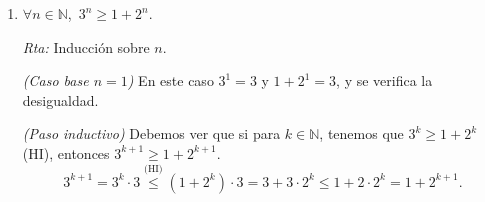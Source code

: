 \documentclass[12pt,spanish,makeidx]{amsbook}
\newcommand{\rta}{\noindent\textit{Rta: }}
\begin{document}
\begin{enumerate}
\begin{enumerate}
			\rta  Se probara por inducción sobre $n$. 
			
			\textit{(Caso base $n=4$) } En  este caso $4^2 = 16$ y $2^4 = 16$, luego $4^2 \le 2^4$.
			
			\textit{(Paso inductivo)} Debemos probar que si para $k \ge 4$ se cumple  que  $k^2\leq 2^k$ (HI),  entonces $(k+1)^2\leq 2^{k+1}$. 
			\begin{equation*}
			\begin{array}{rclr}
				(k+1)^2 &=& k^2 + 2k +1 \overset{\text{(HI)}}{\le} 2^k +2k +1. \hfill &\quad \hfill(*)
			\end{array}
			\end{equation*}
			Por otro lado, $2^{k+1} = 2 \cdot 2^k = 2^k + 2^k$, deberíamos,  entonces,  probar $2^k +2k +1 \le 2^k +2^k$ o equivalentemente, 
			\begin{equation*}
			\begin{array}{rclr}
			2k +1   &\le&2^k. \hfill &\qquad\qquad\qquad\qquad\qquad\qquad \hfill\hfill(**)
			\end{array}
			\end{equation*}
			Para probar esto debemos hacer inducción nuevamente. El caso base es $k=4$, y en ese caso $2\cdot 4+ 1 = 9 \le 2^4 = 16$. En  el paso inductivo debemos probar que $2s+ 1 < 2^s \text{ (HI) } \Rightarrow 2(s+1)+ 1 < 2^{s+1}$. Ahora bien, 
			\begin{equation*}
				2(s+1)+ 1  = (2s + 1) +2 \overset{\text{(HI)}}{\le} 2^s + 2 < 2^s + 2^s = 2\cdot 2^s = 2^{s+1}. 
			\end{equation*}    
			Luego,  hemos probado $(**)$. Por lo tanto
			\begin{equation*}
				(k+1)^2 \overset{(*)}{\le}  2^k +2k +1 \overset{(**)}{\le} 2^k + 2^k = 2^{k+1}.
			\end{equation*}
			 
			
			\item $\forall n \in {\mathbb N}$,\ $3^n \ge 1 + 2^n$.
			
			\rta Inducción sobre $n$.
			
			\textit{(Caso base $n=1$) } En este caso $3^1 = 3$ y $1+2^1 = 3$, y se verifica la desigualdad.
			
			\textit{(Paso inductivo) } Debemos ver que si para $k \in \mathbb N$, tenemos que   $3^{k} \ge 1 + 2^k$ (HI),  entonces $3^{k+1} \ge 1 + 2^{k+1}$. 
			\begin{equation*}
				3^{k+1} = 3^k\cdot 3 \overset{\text{(HI)}}{\le} (1 + 2^k) \cdot 3 = 3 + 3 \cdot 2^k \le 1 + 2\cdot 2^k = 1 + 2^{k+1}.
			\end{equation*}
			

\end{enumerate}
\end{enumerate}
\end{document}
